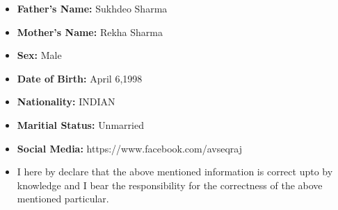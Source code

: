 \documentclass[a4paper,12pt]{memoir}
\begin{document}

  

\begin{itemize}
  \item{\textbf{Father's Name: }}{Sukhdeo Sharma}
  \item{\textbf{Mother's Name: }}{Rekha Sharma}
  \item{\textbf{Sex: }}{Male}
  \item{\textbf{Date of Birth: }}{April 6,1998}
  \item{\textbf{Nationality: }}{INDIAN}
  \item{\textbf{Maritial Status: }}{Unmarried}
  \item{\textbf{Social Media: }}{ https://www.facebook.com/avseqraj}
  \Sep
\end{itemize}


\begin{itemize}
 \item{}{I here by declare that the above mentioned information is correct upto by knowledge and I bear the responsibility for the 
correctness of the above mentioned particular.}
\Sep
\end{itemize}


 
\end{document}
